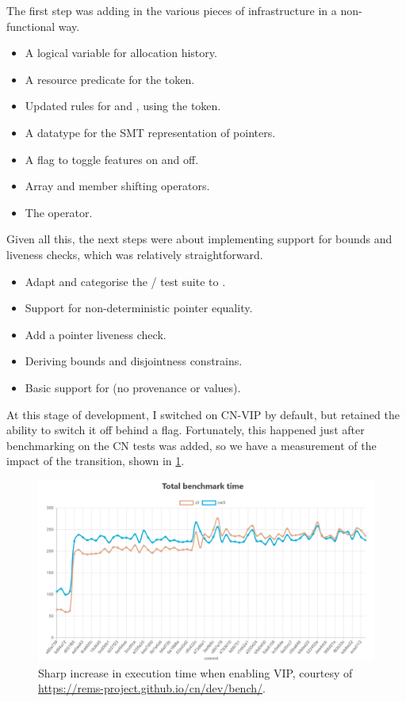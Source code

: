 The first step was adding in the various pieces of infrastructure in a non-functional way.
\begin{itemize}
    \item A logical variable for allocation history.
    \item A resource predicate for the  token.
    \item Updated rules for  and , using the  token.
    \item A datatype for the SMT representation of pointers.
    \item A flag to toggle  features on and off.
    \item Array and member shifting operators.
    \item The  operator.
\end{itemize}

Given all this, the next steps were about implementing support for bounds and
liveness checks, which was relatively straightforward.
\begin{itemize}
    \item Adapt and categorise the / test suite to \@.
    \item Support for non-deterministic pointer equality.
    \item Add a pointer liveness check.
    \item Deriving bounds and disjointness constrains.
    \item Basic support for  (no provenance or
         values).
\end{itemize}

At this stage of development, I switched on CN-VIP by default, but retained the
ability to switch it off behind a flag. Fortunately, this happened just after
benchmarking on the CN tests was added, so we have a measurement of the impact
of the transition, shown in \cref{fig:vip-performance-hit}.

\begin{figure}[h]
    \centering
    \includegraphics[width=\textwidth]{../misc/vip-performance-hit.png}
    \caption{Sharp increase in execution time when enabling VIP, courtesy of
        \url{https://rems-project.github.io/cn/dev/bench/}.}\label{fig:vip-performance-hit}
\end{figure}

